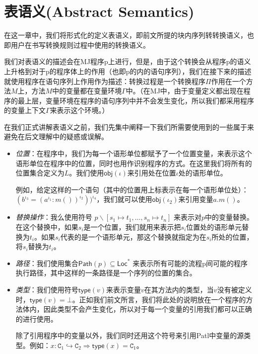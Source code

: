 
\chapter{表语义(Abstract Semantics)}

在这一章中，我们将形式化的定义表语义，即前文所提的块内序列转转换语义，也即用户在书写转换规则过程中使用的转换语义。

我们对表语义的描述会在MJ程序p上进行，但是，由于这个转换会从程序p的语义上升格到对于p的程序体上的作用（也即p的内的语句序列），我们在接下来的描述就使用程序在语句序列上作用作为描述：转换过程是一个转换程序$\Pi$作用在一个方法$M$上，方法$M$中的变量都在变量环境$\Gamma$中。（在MJ中，由于变量定义都出现在程序的最上层，变量环境在程序的语句序列中并不会发生变化，所以我们都采用程序的变量上下文$\Gamma$来表示这个环境。）

在我们正式讲解表语义之前，我们先集中阐释一下我们所需要使用到的一些属于来避免在后文理解中的疑惑或误解。

\newcommand{\typefunc}{\mathsf{type}}
\newcommand{\Path}{\mathsf{Path}}
\newcommand{\Loc}{\mathsf{Loc}}
\newcommand{\CC}{\mathtt{C}}
\newcommand{\loc}{\iota}

\begin{itemize}
\item \textit{位置}：在程序中，我们为每一个语形单位都赋予了一个位置变量，来表示这个语形单位在程序中的位置，同时也用作识别程序的方式。在这里我们将所有的位置集合定义为$L$。我们使用$\mathsf{obj}(\iota)$来引用处在位置$\iota$处的语形单位。

例如，给定这样的一个语句（其中的位置用上标表示在每一个语形单位处）：$(b^{\iota_3} = (a^{\iota_1}:m())^{\iota_2}))^{\iota_4}$，我们就可以使用$\mathsf{obj}(\iota_2)$来引用变量$a.m()$。

\item \textit{替换操作}：我么使用符号 $p\backslash [s_1\mapsto t_1, \ldots, s_n\mapsto t_n]$ 来表示对$p$中的变量替换。在这个替换中，如果$s_i$是一个位置，我们就用来表示把$s_i$位置处的语形单元替换为$t_i$。如果$s_i$代表的是一个语形单元，那这个替换就指定为在$s_i$所处的位置，将$s_i$替换为$t_i$。

\item \textit{路径}：我们使用集合$\Path(p) \subseteq \Loc^*$ 来表示所有可能的流程p间可能的程序执行路径，其中这样的一条路径是一个序列的位置的集合。

\item \textit{类型}：我们使用符号$\typefunc(v)$来表示变量$v$在其方法内的类型，当$v$没有被定义时，$\typefunc(v)=\bot$。正如我们前文所言，我们将此处的说明放在一个程序的方法体内，因此类型不会产生变化，所以对于每一个变量的引用我们都可以正确的进行使用。

除了引用程序中的变量以外，我们同时还用这个符号来引用Patl中变量的源类型。例如：$x:\mathtt{C}_1\hookrightarrow\mathtt{C}_2\Rightarrow \typefunc(x)=\mathtt{C}_1$。

\end{itemize}

